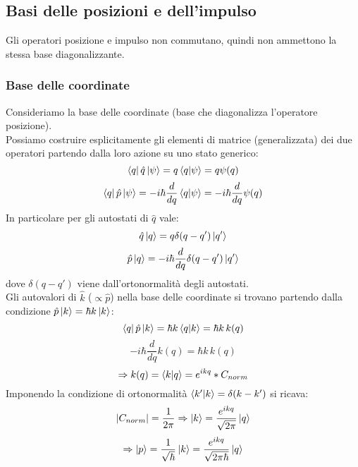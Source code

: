\documentclass{article}
\begin{document}
\subsection{Basi delle posizioni e dell'impulso}
Gli operatori posizione e impulso non commutano, quindi non ammettono la stessa base diagonalizzante.

\subsubsection{Base delle coordinate}
Consideriamo la base delle coordinate (base che diagonalizza l'operatore posizione). 
\\Possiamo costruire esplicitamente gli elementi di matrice (generalizzata) dei due operatori partendo dalla loro azione su uno stato generico:
$$ \bra{q}\hat{q}\ket{\psi}=q\bra{q}\ket{\psi}=q\psi(q) $$
$$ \bra{q}\hat{p}\ket{\psi}=-i\hbar\frac{d}{dq}\bra{q}\ket{\psi}=-i\hbar\frac{d}{dq}\psi(q) $$
In particolare per gli autostati di $\hat{q}$ vale:
$$ \hat{q}\ket{q}=q\delta(q-q')\ket{q'} $$
$$ \hat{p}\ket{q}=-i\hbar\frac{d}{dq}\delta(q-q')\ket{q'} $$
dove $\delta(q-q')$ viene dall'ortonormalità degli autostati.\\
Gli autovalori di $\hat{k}$ ($\propto\hat{p}$) nella base delle coordinate si trovano partendo dalla condizione $\hat{p}\ket{k}=\hbar k\ket{k}$:
$$ \bra{q}\hat{p}\ket{k}=\hbar k \bra{q}\ket{k}=\hbar k\,k(q) $$
$$ -i\hbar\frac{d}{dq}k(q)=\hbar k\,k(q) $$
$$\Rightarrow k(q)=\bra{k}\ket{q}=e^{ikq}*C_{norm}$$
Imponendo la condizione di ortonormalità $\bra{k'}\ket{k}=\delta(k-k')$ si ricava:
$$ |C_{norm}|=\frac{1}{2\pi}\Rightarrow\ket{k}=\frac{e^{ikq}}{\sqrt{2\pi}}\ket{q} $$
$$ \Rightarrow \ket{p}=\frac{1}{\sqrt{\hbar}}\ket{k}= \frac{e^{ikq}}{\sqrt{2\pi\hbar}}\ket{q}$$
\end{document}
